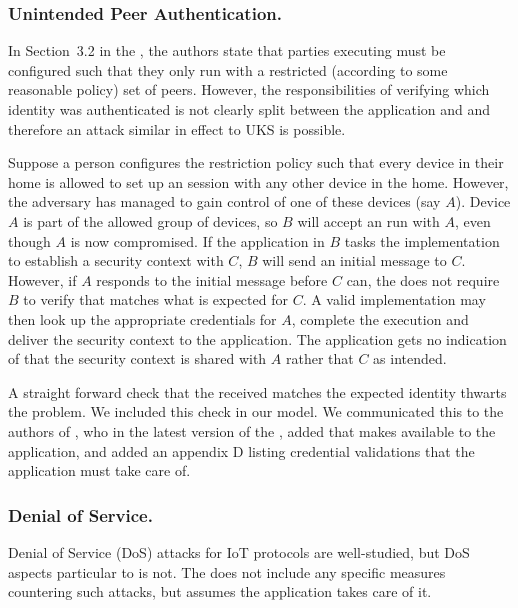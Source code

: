 \documentclass[runningheads]{llncs}
\begin{document}
\subsubsection{Unintended Peer Authentication.}
\label{sec:unintendedPeerAuth}
In Section~3.2 in the \mSpec{}, the authors state that parties executing
\mEdhoc{} must be configured such that they only run \mEdhoc{} with a
restricted (according to some reasonable policy) set of peers.
%
However, the responsibilities of verifying which identity was authenticated is
not clearly split between the application and \mEdhoc{} and therefore an attack
similar in effect to UKS is possible.
%

Suppose a person configures the restriction policy such that every device in
their home is allowed to set up an \mEdhoc{} session with any other device in
the home.
%
However, the adversary has managed to gain control of one of these devices (say
$A$).
%
Device $A$ is part of the allowed group of devices, so $B$ will accept an
\mEdhoc{} run with $A$, even though $A$ is now compromised.
%
If the application in $B$ tasks the \mEdhoc{} implementation to establish a
security context with $C$, $B$ will send an initial message to $C$.
%
However, if $A$ responds to the initial message before $C$ can, the \mSpec{}
does not require $B$ to verify that \mIdcredr{} matches what is expected for
$C$.
%
A valid \mEdhoc{} implementation may then look up the appropriate credentials
for $A$, complete the execution and deliver the security context to the
application.
%
The application gets no indication of that the security context is shared with
$A$ rather that $C$ as intended.
%

A straight forward check that the received \mIdcredr{} matches the expected
identity thwarts the problem.
%
We included this check in our model.
%
We communicated this to the authors of \mEdhoc{}, who in the latest version of
the \mSpec{}, added that \mEdhoc{} makes \mIdcredr{} available to the
application, and added an appendix D listing credential validations that
the application must take care of.
%

\subsubsection{Denial of Service.}
Denial of Service (DoS) attacks for IoT protocols are well-studied,
but DoS aspects particular to \mEdhoc{} is not.
%
The \mSpec{} does not include any specific measures countering such
attacks, but assumes the application takes care of it.
\end{document}

